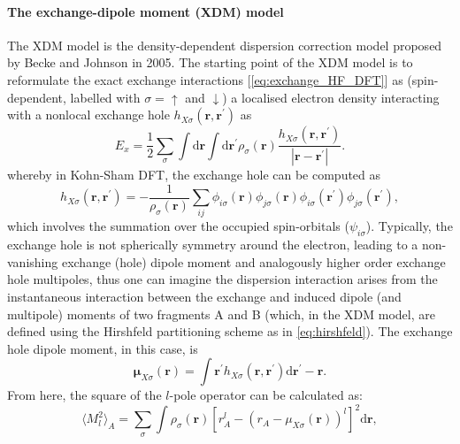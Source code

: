 \paragraph{\textbf{The exchange-dipole moment (XDM) model}}
The XDM model is the density-dependent dispersion correction model proposed by Becke and Johnson in 2005.\cite{johnson2005post,becke2005density,becke2005exchange,johnson2006post,becke2007exchange,otero2013many} The starting point of the XDM model is to reformulate the exact exchange interactions [\cref{eq:exchange_HF_DFT}] as (spin-dependent, labelled with $\sigma=\uparrow$ and $\downarrow$) a localised electron density interacting with a nonlocal exchange hole $h_{X\sigma}(\bm{r},\bm{r}^\prime)$ as
\begin{equation}\label{eq:exchange_interaction_hole_form}
    E_{x}=\frac{1}{2}\sum_{\sigma}\int \mbox{d}\bm{r}\int\mbox{d}\bm{r}^\prime \rho_\sigma (\bm{r})\frac{h_{X\sigma}(\bm{r},\bm{r}^\prime)}{|\bm{r}-\bm{r}^\prime|}.
\end{equation}
whereby in Kohn-Sham DFT, the exchange hole can be computed as
\begin{equation}\label{eq:exchange_hole}
h_{X\sigma}(\bm{r},\bm{r}^\prime)=-\frac{1}{\rho_\sigma(\bm{r})}\sum_{ij} \phi_{i\sigma}(\bm{r}) \phi_{j\sigma}(\bm{r}) \phi_{i\sigma}(\bm{r}^\prime) \phi_{j\sigma}(\bm{r}^\prime),
\end{equation}
which involves the summation over the occupied spin-orbitals ($\psi_{i\sigma}$). Typically, the exchange hole is not spherically symmetry around the electron, leading to a non-vanishing exchange (hole) dipole moment and analogously higher order exchange hole multipoles, thus one can imagine the dispersion interaction arises from the instantaneous interaction between the exchange and induced dipole (and multipole) moments of two fragments A and B (which, in the XDM model, are defined using the Hirshfeld partitioning scheme as in \cref{eq:hirshfeld}). The exchange hole dipole moment, in this case, is
\begin{equation}\label{eq:exchange_dipole_moment}
\bm{\mu}_{X\sigma}(\bm{r})=\int \bm{r}^\prime h_{X\sigma}(\bm{r},\bm{r}^\prime)\mbox{d}\bm{r}^\prime -\bm{r}.
\end{equation}
From here, the square of the $l$-pole operator can be calculated as:
\begin{equation}\label{eq:XDM_l_pole_moment}
\langle M_l^2\rangle_A=\sum_\sigma\int \rho_\sigma(\bm{r})[r_A^l -(r_A-\mu_{X\sigma}(\bm{r}))^l]^2\mbox{d}\bm{r},
\end{equation}

